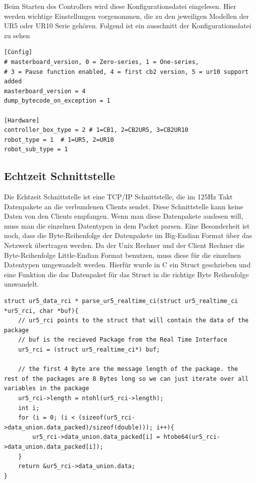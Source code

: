 Beim Starten des Controllers wird diese Konfigurationsdatei eingelesen.
Hier werden wichtige Einstellungen vorgenommen, die zu den jeweiligen Modellen der UR5 oder UR10 Serie gehören. Folgend ist ein ausschnitt der Konfigurationsdatei zu sehen
\\
\begin{lstlisting}[caption={Ausschnitt aus der Datei urcontrol.conf zur vorkonfigurierung des UR5 Roboters}, label=lst:ur5_conf ,captionpos=b]
[Config]
# masterboard_version, 0 = Zero-series, 1 = One-series, 
# 3 = Pause function enabled, 4 = first cb2 version, 5 = ur10 support added
masterboard_version = 4
dump_bytecode_on_exception = 1

[Hardware]
controller_box_type = 2 # 1=CB1, 2=CB2UR5, 3=CB2UR10
robot_type = 1  # 1=UR5, 2=UR10
robot_sub_type = 1
\end{lstlisting}

\subsection{Echtzeit Schnittstelle}
\label{urcontrol_rci_gru}

Die Echtzeit Schnittstelle ist eine \acs{TCP/IP} Schnittstelle, die im 125Hz Takt Datenpakete an die verbundenen Clients sendet. Diese Schnittstelle kann keine Daten von den Clients empfangen. Wenn man diese Datenpakete auslesen will, muss man die einzelnen Datentypen in dem Packet \acs{parsen}. Eine Besonderheit ist noch, dass die Byte-Reihenfolge der Datenpakete im \acs{Big-Endian Format} über das Netzwerk übertragen werden. Da der Unix Rechner und der Client Rechner die Byte-Reihenfolge \acs{Little-Endian Format} benutzen, muss diese für die einzelnen Datentypen umgewandelt werden. Hierfür wurde in C ein Struct geschrieben und eine Funktion die das Datenpaket für das Struct in die richtige Byte Reihenfolge umwandelt.

\begin{lstlisting}[caption={Umwandlung der Byte-Order für Packet über die Echtzeit-Schnittstellen }, label=lst:rci_parse ,captionpos=b]
struct ur5_data_rci * parse_ur5_realtime_ci(struct ur5_realtime_ci *ur5_rci, char *buf){
    // ur5_rci points to the struct that will contain the data of the package
    // buf is the recieved Package from the Real Time Interface
    ur5_rci = (struct ur5_realtime_ci*) buf;

    // the first 4 Byte are the message length of the package. the rest of the packages are 8 Bytes long so we can just iterate over all variables in the package 
    ur5_rci->length = ntohl(ur5_rci->length);
    int i;
    for (i = 0; (i < (sizeof(ur5_rci->data_union.data_packed)/sizeof(double))); i++){
        ur5_rci->data_union.data_packed[i] = htobe64(ur5_rci->data_union.data_packed[i]);
    }
    return &ur5_rci->data_union.data;
}
\end{lstlisting}

